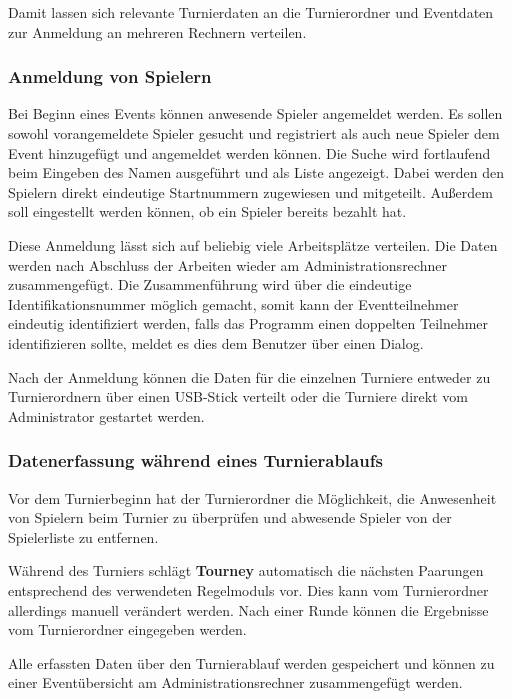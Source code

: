 \documentclass[11pt]{article}
\begin{document}
Damit lassen sich relevante Turnierdaten an die Turnierordner und Eventdaten zur Anmeldung an mehreren Rechnern verteilen.

\newpage

\subsubsection{Anmeldung von Spielern}

Bei Beginn eines Events können anwesende Spieler angemeldet werden. Es sollen sowohl vorangemeldete Spieler gesucht und registriert als auch neue Spieler dem Event hinzugefügt und angemeldet werden können. Die Suche wird fortlaufend beim Eingeben des Namen ausgeführt und als Liste angezeigt. Dabei werden den Spielern direkt eindeutige Startnummern zugewiesen und mitgeteilt. Außerdem soll eingestellt werden können, ob ein Spieler bereits bezahlt hat.

Diese Anmeldung lässt sich auf beliebig viele Arbeitsplätze verteilen. Die Daten werden nach Abschluss der Arbeiten wieder am Administrationsrechner zusammengefügt. Die Zusammenführung wird über die eindeutige Identifikationsnummer möglich gemacht, somit kann der Eventteilnehmer eindeutig identifiziert werden, falls das Programm einen doppelten Teilnehmer identifizieren sollte, meldet es dies dem Benutzer über einen Dialog.

Nach der Anmeldung können die Daten für die einzelnen Turniere entweder zu Turnierordnern über einen USB-Stick verteilt oder die Turniere direkt vom Administrator gestartet werden.

\subsubsection{Datenerfassung während eines Turnierablaufs}

Vor dem Turnierbeginn hat der Turnierordner die Möglichkeit, die Anwesenheit von Spielern beim Turnier zu überprüfen und abwesende Spieler von der Spielerliste zu entfernen.

Während des Turniers schlägt \textbf{Tourney} automatisch die nächsten Paarungen entsprechend des verwendeten Regelmoduls vor. Dies kann vom Turnierordner allerdings manuell verändert werden. Nach einer Runde können die Ergebnisse vom Turnierordner eingegeben werden.

Alle erfassten Daten über den Turnierablauf werden gespeichert und können zu einer Eventübersicht am Administrationsrechner zusammengefügt werden.
\end{document}
